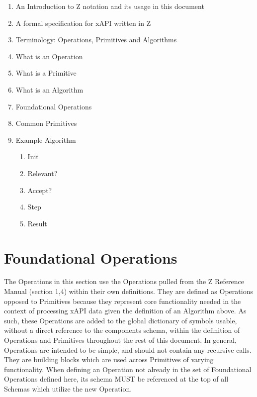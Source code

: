 \documentclass{article}
\begin{document}
\begin{enumerate}
\item An Introduction to Z notation and its usage in this document
\item A formal specification for xAPI written in Z %
\item Terminology: Operations, Primitives and Algorithms
\item What is an Operation
\item What is a Primitive
\item What is an Algorithm
\item Foundational Operations
\item Common Primitives
\item Example Algorithm
  \begin{enumerate}
  \item Init %
  \item Relevant? %
  \item Accept? %
  \item Step %
  \item Result %
  \end{enumerate}
\end{enumerate}






\section{Foundational Operations}
The Operations in this section use the Operations pulled from the Z Reference Manual (section 1,4) within their own definitions.
They are defined as Operations opposed to Primitives because they represent core functionality needed in the context
of processing xAPI data given the definition of an Algorithm above. As such, these Operations are added to the global
dictionary of symbols usable, without a direct reference to the components schema, within the definition of
Operations and Primitives throughout the rest of this document. In general, Operations are intended to be
simple, and should not contain any recursive calls. They are building blocks which are used across Primitives
of varying functionality. When defining an Operation not already in the set of Foundational Operations defined here, its schema
MUST be referenced at the top of all Schemas which utilize the new Operation.
\end{document}
